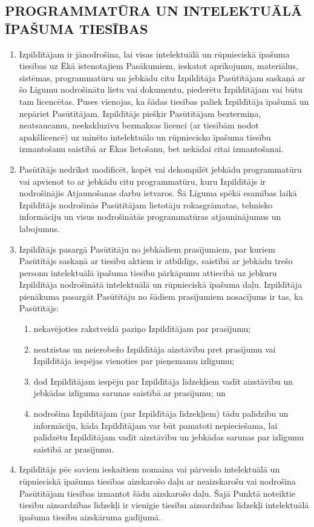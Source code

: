 \begin{multicols}{2}
\subsection{PROGRAMMATŪRA UN INTELEKTUĀLĀ ĪPAŠUMA TIESĪBAS}
\begin{enumerate}
	\item Izpildītājam ir jānodrošina, lai visas intelektuālā un rūpnieciskā īpašuma tiesības uz Ēkā īstenotajiem Pasākumiem, ieskatot aprīkojumu, materiālus, sistēmas, programmatūru un jebkādu citu Izpildītāja Pasūtītājam saskaņā ar šo Līgumu nodrošinātu lietu vai dokumentu, piederētu Izpildītājam vai būtu tam licencētas. Puses vienojas, ka šādas tiesības paliek Izpildītāja īpašumā un nepāriet Pasūtītājam. Izpildītājs piešķir Pasūtītājam beztermiņa, neatsaucamu, neekskluzīvu bezmaksas licenci (ar tiesībām nodot apakšlicencē) uz minēto intelektuālo un rūpniecisko īpašuma tiesību izmantošanu saistībā ar Ēkas lietošanu, bet nekādai citai izmantošanai.
	\item Pasūtītājs nedrīkst modificēt, kopēt vai dekompilēt jebkādu programmatūru vai apvienot to ar jebkādu citu programmatūru, kuru Izpildītājs ir nodrošinājis Atjaunošanas darbu ietvaros. Šā Līguma spēkā esamības laikā Izpildītājs nodrošinās Pasūtītājam lietotāju rokasgrāmatas, tehnisko informāciju un visus nodrošinātās programmatūras atjauninājumus un labojumus.
	\item Izpildītājs pasargā Pasūtītāju no jebkādiem prasījumiem, par kuriem Pasūtītājs saskaņā ar tiesību aktiem ir atbildīgs, saistībā ar jebkādu trešo personu intelektuālā īpašuma tiesību pārkāpumu attiecībā uz jebkuru Izpildītāja nodrošinātā intelektuālā un rūpnieciskā īpašuma daļu. Izpildītāja pienākuma pasargāt Pasūtītāju no šādiem prasījumiem nosacījums ir tas, ka Pasūtītājs:
	\begin{enumerate}
		\item nekavējoties rakstveidā paziņo Izpildītājam par prasījumu;
		\item neatzīstas un neierobežo Izpildītāja aizstāvību pret prasījumu vai Izpildītāja iespējas vienoties par pieņemamu izlīgumu;
		\item dod Izpildītājam iespēju par Izpildītāja līdzekļiem vadīt aizstāvību un jebkādas izlīguma sarunas saistībā ar prasījumu; un
		\item nodrošina Izpildītājam (par Izpildītāja līdzekļiem) tādu palīdzību un informāciju, kāda Izpildītājam var būt pamatoti nepieciešama, lai palīdzētu Izpildītājam vadīt aizstāvību un jebkādas sarunas par izlīgumu saistībā ar prasījumu.
	\end{enumerate}
	\item Izpildītājs pēc saviem ieskaitiem nomaina vai pārveido intelektuālā un rūpnieciskā īpašuma tiesības aizskarošo daļu ar neaizskarošu vai nodrošina Pasūtītājam tiesības izmantot šādu aizskarošo daļu. Šajā Punktā noteiktie tiesību aizsardzības līdzekļi ir vienīgie tiesību aizsardzības līdzekļi intelektuālā īpašuma tiesību aizskāruma gadījumā.
\end{enumerate}


\end{multicols}
